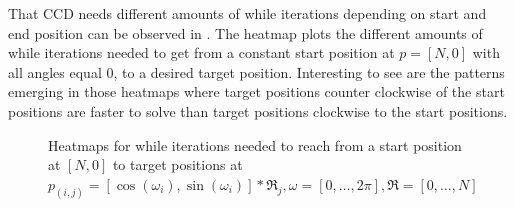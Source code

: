 That CCD needs different amounts of while iterations depending on start and end position can be observed in . The heatmap plots the different amounts of while iterations needed to get from a constant start position at $p = [N, 0]$ with all angles equal $0$, to a desired target position. Interesting to see are the patterns emerging in those heatmaps where target positions counter clockwise of the start positions are faster to solve than target positions clockwise to the start positions.
\begin{figure}
    \begin{center}
        \hfill
		\hfill
    \end{center}
    \caption[CCD iteration heatmap]{Heatmaps for while iterations needed to reach from a start position at $[N, 0]$ to target positions at $p_{(i, j)} = [\cos(\omega_i), \sin(\omega_i)] * \mathfrak{R}_j, \omega = [0, \ldots, 2\pi], \mathfrak{R} = [0, \ldots, N]$}
    \label{fig:ccd_iterations}
\end{figure}

